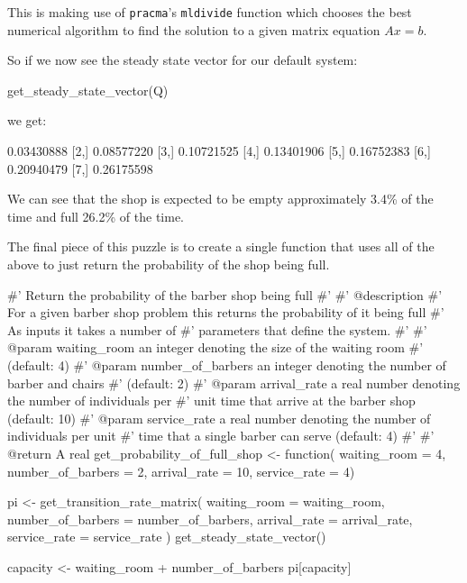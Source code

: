 This is making use of \texttt{pracma}'s \texttt{mldivide} function
which chooses the best numerical algorithm to find the solution to a given
matrix equation \(Ax=b\).

So if we now see the steady state vector for our default system:

\begin{Rin}
get_steady_state_vector(Q)
\end{Rin}

we get:

\begin{Rout}
           [,1]
[1,] 0.03430888
[2,] 0.08577220
[3,] 0.10721525
[4,] 0.13401906
[5,] 0.16752383
[6,] 0.20940479
[7,] 0.26175598
\end{Rout}

We can see that the shop is expected to be empty approximately 3.4\% of the time
and full 26.2\% of the time.

The final piece of this puzzle is to create a single function that uses all of
the above to just return the probability of the shop being full.

\begin{Rin}
#' Return the probability of the barber shop being full
#'
#' @description
#' For a given barber shop problem this returns the probability of it being full
#' As inputs it takes a number of
#' parameters that define the system.
#'
#' @param waiting_room an integer denoting the size of the waiting room
#' (default: 4)
#' @param number_of_barbers an integer denoting the number of barber and chairs
#' (default: 2)
#' @param arrival_rate a real number denoting the number of individuals per
#' unit time that arrive at the barber shop (default: 10)
#' @param service_rate a real number denoting the number of individuals per unit
#' time that a single barber can serve (default: 4)
#'
#' @return A real
get_probability_of_full_shop <- function(
                                         waiting_room = 4,
                                         number_of_barbers = 2,
                                         arrival_rate = 10,
                                         service_rate = 4) {
  pi <- get_transition_rate_matrix(
    waiting_room = waiting_room,
    number_of_barbers = number_of_barbers,
    arrival_rate = arrival_rate,
    service_rate = service_rate
  ) %
    get_steady_state_vector()

  capacity <- waiting_room + number_of_barbers
  pi[capacity]
}
\end{Rin}

